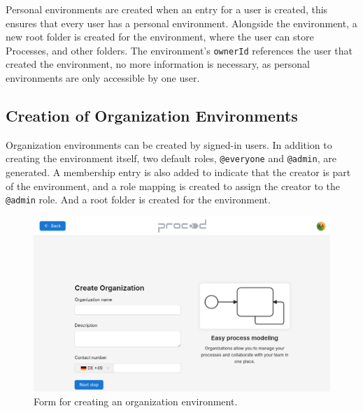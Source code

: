 %
%

Personal environments are created when an entry for a user is created, this ensures that
every user has a personal environment.
Alongside the environment, a new root folder is created for the environment, where the
user can store Processes, and other folders.
The environment's \lstinline{ownerId} references the user that created the environment,
no more information is necessary, as personal environments are only accessible by one
user.

\subsection{Creation of Organization Environments}

Organization environments can be created by signed-in users.
In addition to creating the environment itself, two default roles,
\lstinline{@everyone} and \lstinline{@admin}, are generated.
A membership entry is also added to indicate that the creator is part of the environment,
and a role mapping is created to assign the creator to the \lstinline{@admin} role.
And a root folder is created for the environment.

\begin{figure}[H]
	\centering
	\includegraphics[scale=0.3]{images/create-organization-ui.png}
	\caption{Form for creating an organization environment.}
	\vspace{-1em} %
	\label{fig:prompt-fill-personal-information}
\end{figure}

